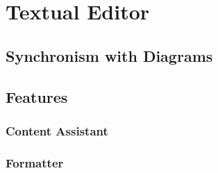 \chapter{\label{text}Textual Editor}

\section{Synchronism with Diagrams}
\section{Features}
\subsection{Content Assistant}
\subsection{Formatter}
